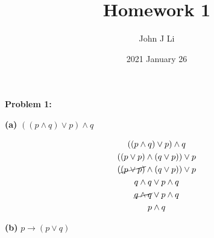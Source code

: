 \documentclass{article}
\title{Homework 1}
\date{2021 January 26}
\author{John J Li}
\begin{document}
    \maketitle
    \newpage

    \textbf{Problem 1:}

    \quad \textbf{(a)} $((p\land q)\lor p) \land q$

    \begin{gather*}
        ((p\land q)\lor p) \land q \\
        ((p \lor p) \land (q \lor p)) \lor p \\
        (\cancel{(p \lor p)} \land (q \lor p)) \lor p \\
        q\land q \lor p \land q \\
        \cancel{q\land q} \lor p \land q \\
        p \land q
    \end{gather*}


    \quad\textbf{(b)} $p\rightarrow (p\lor q)$
\end{document}
